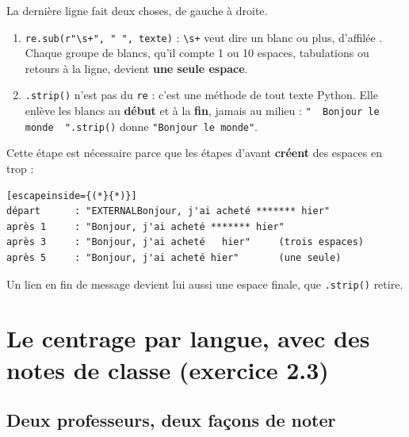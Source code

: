 \begin{stepbox}[title={5\quad Des espaces simples}]
La dernière ligne fait deux choses, de gauche à droite.
\begin{enumerate}[nosep]
\item \verb|re.sub(r"\s+", " ", texte)| : \verb|\s+| veut dire \og un blanc ou plus, d'affilée \fg. Chaque
  groupe de blancs, qu'il compte 1 ou 10 espaces, tabulations ou retours à la ligne, devient \textbf{une
  seule espace}.
\item \texttt{.strip()} n'est pas du \texttt{re} : c'est une méthode de tout texte Python. Elle enlève les
  blancs au \textbf{début} et à la \textbf{fin}, jamais au milieu :
  \verb|"  Bonjour le monde  ".strip()| donne \verb|"Bonjour le monde"|.
\end{enumerate}
Cette étape est nécessaire parce que les étapes d'avant \textbf{créent} des espaces en trop :
\begin{lstlisting}[escapeinside={(*}{*)}]
départ      : "EXTERNALBonjour, j'ai acheté ******* hier"
après 1     : "Bonjour, j'ai acheté ******* hier"
après 3     : "Bonjour, j'ai acheté   hier"     (trois espaces)
après 5     : "Bonjour, j'ai acheté hier"       (une seule)
\end{lstlisting}
Un lien en fin de message devient lui aussi une espace finale, que \texttt{.strip()} retire.
\end{stepbox}

\section{Le centrage par langue, avec des notes de classe (exercice 2.3)}

\subsection{Deux professeurs, deux façons de noter}

